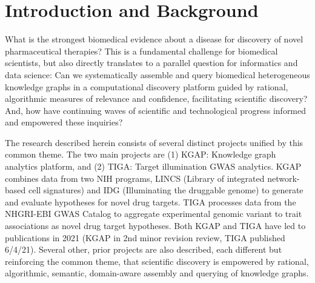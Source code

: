 \chapter{Introduction and Background}
What is the strongest biomedical evidence about a disease for discovery of novel pharmaceutical therapies? This is a fundamental challenge for biomedical scientists, but also directly translates to a parallel question for informatics and data science: Can we systematically assemble and query biomedical heterogeneous knowledge graphs in a computational discovery platform guided by rational, algorithmic measures of relevance and confidence, facilitating scientific discovery? And, how have continuing waves of scientific and technological progress informed and empowered these inquiries? 

The research described herein consists of several distinct projects unified by this common theme. The two main projects are (1) KGAP: Knowledge graph analytics platform, and (2) TIGA: Target illumination GWAS analytics. KGAP combines data from two NIH programs, LINCS (Library of integrated network-based cell signatures)  and IDG (Illuminating the druggable genome) to generate and evaluate hypotheses for novel drug targets. TIGA processes data from the NHGRI-EBI GWAS Catalog to aggregate experimental genomic variant to trait associations as novel drug target hypotheses.  Both KGAP and TIGA have led to publications in 2021 (KGAP in 2nd minor revision review, TIGA published 6/4/21). Several other, prior projects are also described, each different but reinforcing the common theme, that scientific discovery is empowered by rational, algorithmic, semantic, domain-aware assembly and querying of knowledge graphs. 

